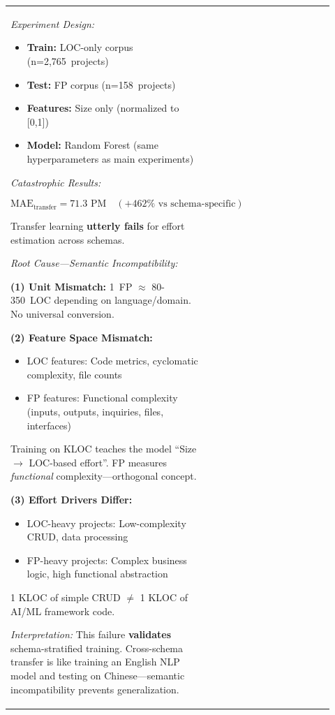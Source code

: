 \documentclass[11pt,a4paper]{article}
\begin{document}
\begin{longtable}{>{\raggedright\arraybackslash}p{0.26\linewidth}|>{\raggedright\arraybackslash}p{0.44\linewidth}|>{\raggedright\arraybackslash}p{0.22\linewidth}}
\textit{Experiment Design:}

\begin{itemize}
    \item \textbf{Train:} LOC-only corpus (n=2,765~projects)
    \item \textbf{Test:} FP corpus (n=158~projects)
    \item \textbf{Features:} Size only (normalized to [0,1])
    \item \textbf{Model:} Random Forest (same hyperparameters as main experiments)
\end{itemize}

\textit{Catastrophic Results:}

$$\text{MAE}_{\text{transfer}} = 71.3 \text{ PM} \quad (+462\% \text{ vs schema-specific})$$

Transfer learning \textbf{utterly fails} for effort estimation across schemas.

\textit{Root Cause---Semantic Incompatibility:}

\textbf{(1) Unit Mismatch:} 1~FP $\approx$ 80-350~LOC depending on language/\allowbreak domain. No universal conversion.

\textbf{(2) Feature Space Mismatch:}
\begin{itemize}
    \item LOC features: Code metrics, cyclomatic complexity, file counts
    \item FP features: Functional complexity (inputs, outputs, inquiries, files, interfaces)
\end{itemize}

Training on KLOC teaches the model ``Size $\rightarrow$ LOC-based effort''. FP measures \textit{functional} complexity---orthogonal concept.

\textbf{(3) Effort Drivers Differ:}
\begin{itemize}
    \item LOC-heavy projects: Low-complexity CRUD, data processing
    \item FP-heavy projects: Complex business logic, high functional abstraction
\end{itemize}

1 KLOC of simple CRUD $\neq$ 1 KLOC of AI/ML framework code.

\textit{Interpretation:} This failure \textbf{validates} schema-stratified training. Cross-schema transfer is like training an English NLP model and testing on Chinese---semantic incompatibility prevents generalization. &


\end{longtable}
\end{document}
